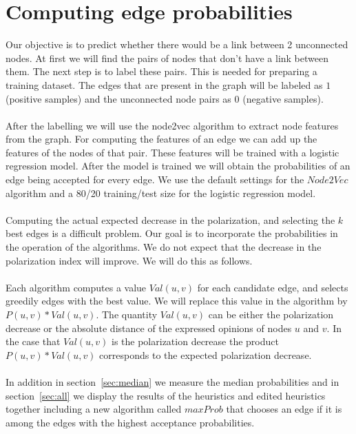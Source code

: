 \section{Computing edge probabilities }		
\label{sec:computingEdge}		
\vspace{20pt}
Our objective is to predict whether there would be a link between 2 unconnected nodes. At first we will find the pairs of nodes that don't have a link between them.	
The next step is to label these pairs. This is needed for preparing a training dataset. 
The edges that are present in the graph will be labeled as $1$ (positive samples) and the unconnected node pairs as $0$ (negative samples).		
\\
\\
\noindent After the labelling we will use the node2vec algorithm to extract node features from the graph. For computing the features of an edge we can add up the features of the nodes of that pair. These features will be trained with a logistic regression model. After the model is trained we will obtain the probabilities of an edge being accepted for every edge. We use the default settings for the $Node2Vec$ algorithm and a 80/20 training/test size for the logistic regression model.
\\
\\
\noindent Computing the actual expected decrease in the polarization, and selecting the $k$ best edges is a difficult problem. Our goal is to incorporate the probabilities in the operation of the algorithms. We do not expect that the decrease in the polarization index will improve. We will do this as follows. 
\\
\\
Each algorithm computes a value $Val(u,v)$ for each candidate edge, and selects greedily edges with the best value. We will replace this value in the algorithm by $P(u,v)*Val(u,v)$. The quantity $Val(u,v)$ can be either the polarization decrease or the absolute distance of the expressed opinions of nodes $u$ and $v$. In the case that $Val(u,v)$ is the polarization decrease the product $P(u,v)*Val(u,v)$ corresponds to the expected polarization decrease.
\\
\\
In addition in section~\ref{sec:median}  we measure the median probabilities and in section~\ref{sec:all} we display the results of the heuristics and edited heuristics together including a new algorithm called $maxProb$ that chooses an edge if it is among the edges with the highest acceptance probabilities.

\clearpage

